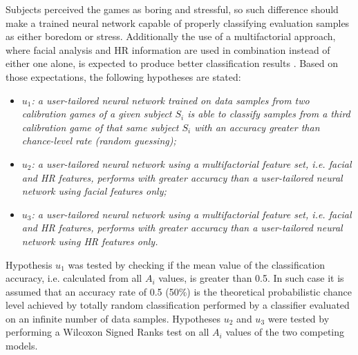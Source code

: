 

Subjects perceived the games as boring and stressful, so such difference should make a trained neural network capable of properly classifying evaluation samples as either boredom or stress. Additionally the use of a multifactorial approach, where facial analysis and HR information are used in combination instead of either one alone, is expected to produce better classification results \parencite{zacharatos2014automatic}. Based on those expectations, the following hypotheses are stated:

\begin{itemize}
  \item[] \textit{$u_1$: a user-tailored neural network trained on data samples from two calibration games of a given subject $S_i$ is able to classify samples from a third calibration game of that same subject $S_i$ with an accuracy greater than chance-level rate (random guessing);}
  \item[] \textit{$u_2$: a user-tailored neural network using a multifactorial feature set, i.e. facial and HR features, performs with greater accuracy than a user-tailored neural network using facial features only;}
  \item[] \textit{$u_3$: a user-tailored neural network using a multifactorial feature set, i.e. facial and HR features, performs with greater accuracy than a user-tailored neural network using HR features only.}
\end{itemize}

Hypothesis $u_1$ was tested by checking if the mean value of the classification accuracy, i.e. calculated from all $A_i$ values, is greater than 0.5. In such case it is assumed that an accuracy rate of 0.5 (50\%) is the theoretical probabilistic chance level achieved by totally random classification performed by a classifier evaluated on an infinite number of data samples. Hypotheses $u_2$ and $u_3$ were tested by performing a Wilcoxon Signed Ranks test on all $A_i$ values of the two competing models.



